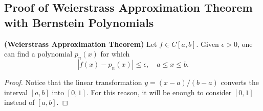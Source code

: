 \documentclass[12pt]{article}
\begin{document}
\subsection{Proof of Weierstrass Approximation Theorem with Bernstein Polynomials}
\begin{theorem}{\bf (Weierstrass Approximation Theorem)}
    Let $f \in C[a, b]$. Given $\epsilon > 0$, one can find a polynomial $p_n(x)$ for which
\begin{equation}
    |f(x) - p_n(x)| \leq \epsilon, \quad a \leq x \leq b.
    \label{weierstrass}
\end{equation}
\end{theorem}
\begin{proof}
Notice that the linear transformation $y=(x-a)/(b-a)$ converts the interval $[a,b]$ into $[0,1].$ For this reason, it will be enough to consider $[0,1]$ instead of $[a,b].$


\end{proof}
\end{document}
